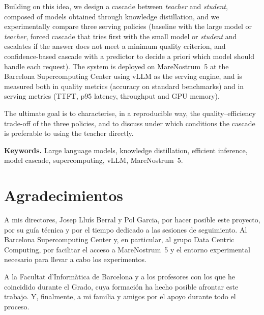 Building on this idea, we design a cascade between \textit{teacher} and \textit{student}, composed of models obtained through knowledge distillation, and we experimentally compare three serving policies (baseline with the large model or \textit{teacher}, forced cascade that tries first with the small model or \textit{student} and escalates if the answer does not meet a minimum quality criterion, and confidence-based cascade with a predictor to decide a priori which model should handle each request). The system is deployed on MareNostrum~5 at the Barcelona Supercomputing Center using vLLM as the serving engine, and is measured both in quality metrics (accuracy on standard benchmarks) and in serving metrics (TTFT, p95 latency, throughput and GPU memory).

The ultimate goal is to characterise, in a reproducible way, the quality--efficiency trade-off of the three policies, and to discuss under which conditions the cascade is preferable to using the teacher directly.

\textbf{Keywords.} Large language models, knowledge distillation, efficient inference, model cascade, supercomputing, vLLM, MareNostrum~5.

\newpage
\section*{Agradecimientos}

A mis directores, Josep Lluís Berral y Pol Garcia, por hacer posible este proyecto, por su guía técnica y por el tiempo dedicado a las sesiones de seguimiento. Al Barcelona Supercomputing Center y, en particular, al grupo Data Centric Computing, por facilitar el acceso a MareNostrum~5 y el entorno experimental necesario para llevar a cabo los experimentos.

A la Facultat d'Informàtica de Barcelona y a los profesores con los que he coincidido durante el Grado, cuya formación ha hecho posible afrontar este trabajo. Y, finalmente, a mi familia y amigos por el apoyo durante todo el proceso.

\newpage
\tableofcontents
\newpage
\listoftables
\newpage
\listoffigures
\newpage

\small

